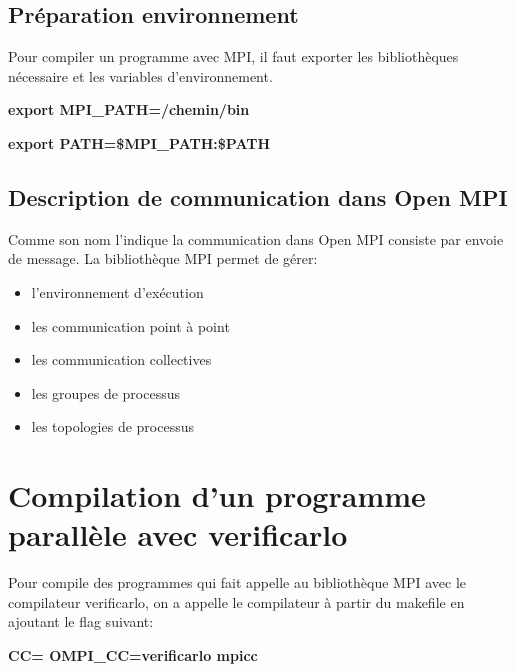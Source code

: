 \documentclass[a4paper,11pt]{report}
\begin{document}
\subsection{Préparation environnement}
\qquad Pour compiler un programme avec MPI, il faut exporter les bibliothèques nécessaire et les variables d'environnement.

\textbf{export MPI\_PATH=/chemin/bin}

\textbf{export PATH=\$MPI\_PATH:\$PATH}

\subsection{Description de communication dans Open MPI}
\qquad Comme son nom l'indique la communication dans Open MPI consiste par envoie de message.
La bibliothèque MPI permet de gérer:
\begin{itemize}
    \item l'environnement d'exécution
    \item les communication point à point
    \item les communication collectives
    \item les groupes de processus
    \item les topologies de processus
\end{itemize}
\section{Compilation d'un programme parallèle avec verificarlo}
\qquad Pour compile des programmes qui fait appelle au bibliothèque MPI avec le compilateur verificarlo, on a appelle le compilateur à partir du makefile en ajoutant le flag suivant:

\textbf{CC= OMPI\_CC=verificarlo mpicc}



\end{document}
